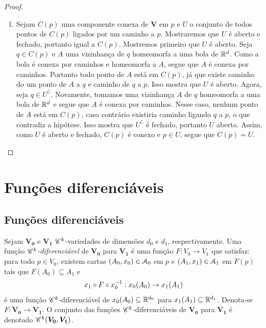 \begin{proof}
\begin{enumerate}
	\item Sejam $C(p)$ uma componente conexa de $\bm V$ em $p$ e $U$ o conjunto de todos pontos de $C(p)$ ligados por um caminho a $p$. Mostraremos que $U$ é aberto e fechado, portanto igual a $C(p)$. Mostremos primeiro que $U$ é aberto. Seja $q \in C(p)$ e $A$ uma vizinhança de $q$ homeomorfa a uma bola de $\mathbb{R}^d$. Como a bola é conexa por caminhos e homeomorfa a $A$, segue que $A$ é conexa por caminhos. Portanto todo ponto de $A$ está em $C(p)$, já que existe caminho do um ponto de $A$ a $q$ e caminho de $q$ a $p$. Isso mostra que $U$ é aberto. Agora, seja $q \in U^\complement$. Novamente, tomamos uma vizinhança $A$ de $q$ homeomorfa a uma bola de $\mathbb{R}^d$ e segue que $A$ é conexa por caminhos. Nesse caso, nenhum ponto de $A$ está em $C(p)$, caso contrário existiria caminho ligando $q$ a $p$, o que contradiz a hipótese. Isso mostra que $U^\complement$ é fechado, portanto $U$ aberto. Assim, como $U$ é aberto e fechado, $C(p)$ é conexo e $p \in U$, segue que $C(p)=U$.
		\end{enumerate}
\end{proof}

\section{Funções diferenciáveis}

\subsection{Funções diferenciáveis}

\begin{definition}
Sejam $\bm{V_0}$ e $\bm{V_1}$ $\mathscr{C}^k$-variedades de dimensões $d_0$ e $d_1$, respectivamente. Uma função \emph{$\mathscr{C}^k$-diferenciável} de $\bm{V_0}$ para $\bm{V_1}$ é uma função
 $F\colon V_0 \to V_1$ que satisfaz: para todo $p \in V_0$, existem cartas $(A_0,x_0) \in \mathcal{A}_0$ em $p$ e $(A_1,x_1) \in \mathcal{A}_1$ em $F(p)$ tais que $F(A_0) \subseteq A_1$ e
		\begin{equation*}
		x_1 \circ F \circ x_0^{-1}: x_0(A_0) \to x_1(A_1)
		\end{equation*}
é uma função $\mathscr{C}^k$-diferenciável de $x_0(A_0) \subseteq \mathbb{R}^{d_0}$ para $x_1(A_1) \subseteq \mathbb{R}^{d_1}$. Denota-se $F\colon \bm{V_0} \to \bm{V_1}$. O conjunto das funções $\mathscr{C}^k$-diferenciáveis de $\bm{V_0}$ para $\bm{V_1}$ é denotado $\mathscr{C}^k(\bm{V_0},\bm{V_1})$. %
\end{definition}


